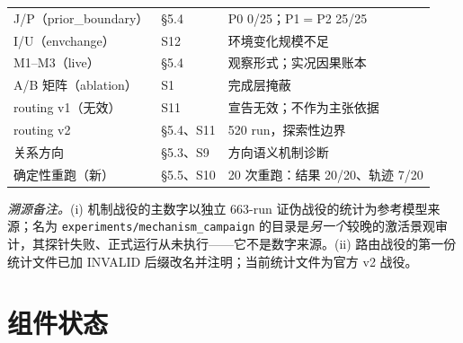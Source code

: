 \documentclass[10pt,a4paper]{ctexart}
\begin{document}
\begin{table}[h]
\begin{tabular}{L{4.6cm}L{3.6cm}L{6.6cm}}
J/P（prior\_boundary） & \S5.4 & P0 0/25；P1$=$P2 25/25 \\
I/U（envchange） & S12 & 环境变化规模不足 \\
M1--M3（live） & \S5.4 & 观察形式；实况因果账本 \\
A/B 矩阵（ablation） & S1 & 完成层掩蔽 \\
routing v1（无效） & S11 & 宣告无效；不作为主张依据 \\
routing v2 & \S5.4、S11 & 520 run，探索性边界 \\
关系方向 & \S5.3、S9 & 方向语义机制诊断 \\
确定性重跑（新） & \S5.5、S10 & 20 次重跑：结果 20/20、轨迹 7/20 \\
\bottomrule
\end{tabular}
\end{table}

\emph{溯源备注。}(i) 机制战役的主数字以独立 663-run 证伪战役的统计为参考模型来源；名为 \texttt{experiments/mechanism\_campaign} 的目录是\emph{另一个}较晚的激活景观审计，其探针失败、正式运行从未执行——它不是数字来源。(ii) 路由战役的第一份统计文件已加 INVALID 后缀改名并注明；当前统计文件为官方 v2 战役。

\section{组件状态}
\label{s4:components}
\end{document}
